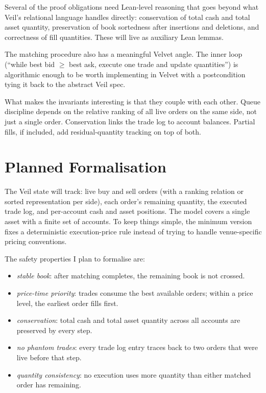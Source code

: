 \documentclass[11pt]{article}
\begin{document}
Several of the proof obligations need Lean-level reasoning that goes beyond
what Veil's relational language handles directly: conservation of total cash
and total asset quantity, preservation of book sortedness after insertions and
deletions, and correctness of fill quantities. These will live as auxiliary
Lean lemmas.

The matching procedure also has a meaningful Velvet angle. The inner loop
(``while best bid $\geq$ best ask, execute one trade and update quantities'')
is algorithmic enough to be worth implementing in Velvet with a postcondition
tying it back to the abstract Veil spec.

What makes the invariants interesting is that they couple with each other.
Queue discipline depends on the relative ranking of all live orders on the
same side, not just a single order. Conservation links the trade log to
account balances. Partial fills, if included, add residual-quantity tracking
on top of both.

\section{Planned Formalisation}

The Veil state will track: live buy and sell orders (with a ranking relation
or sorted representation per side), each order's remaining quantity, the
executed trade log, and per-account cash and asset positions. The model covers
a single asset with a finite set of accounts. To keep things simple, the
minimum version fixes a deterministic execution-price rule instead of trying
to handle venue-specific pricing conventions.

The safety properties I plan to formalise are:

\begin{itemize}[leftmargin=1.5em]
\item \emph{stable book}: after matching completes, the remaining book is not
crossed.
\item \emph{price-time priority}: trades consume the best available orders;
within a price level, the earliest order fills first.
\item \emph{conservation}: total cash and total asset quantity across all
accounts are preserved by every step.
\item \emph{no phantom trades}: every trade log entry traces back to two orders
that were live before that step.
\item \emph{quantity consistency}: no execution uses more quantity than either
matched order has remaining.
\end{itemize}
\end{document}
